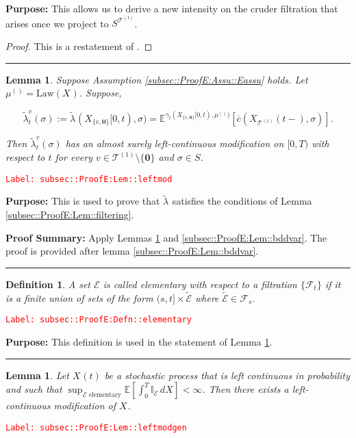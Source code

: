 \documentclass[12pt]{article}
\newcommand{\mb}{\mathbb}
\newcommand{\mc}{\mathcal}
\newcommand{\ov}{\overline}
\newcommand{\te}{\text}
\newcommand{\tr}{\textcolor{red}}
\newcommand{\labe}[1]{\tr{\texttt{Label: #1}}}
\newcommand{\purpose}{\textbf{Purpose: }}
\newcommand{\pfsum}{\textbf{Proof Summary: }}
\newcommand{\lin}{\rule{\linewidth}{0.4 pt}}
\newcommand{\ex}[1]{\mb{E}\left[#1\right]}			%
\newcommand{\exmu}[2]{\mb{E}^{#1}\left[#2\right]}	%
\renewcommand{\root}{\mathbf{0}}				%
\renewcommand{\v}{v}							%
\renewcommand{\S}{S}							%
\newcommand{\s}{\sigma}							%
\newcommand{\T}{T}								%
\renewcommand{\t}{t}							%
\renewcommand{\tt}{s}							%
\newcommand{\F}{\mc{F}}							%
\newcommand{\X}{X}								%
\newcommand{\vind}[1]{^{#1}}					%
\newcommand{\carp}[1]{^{#1}}					%
\newcommand{\vsi}[1]{^{#1}}						%
\newcommand{\cind}[1]{_{#1}}					%
\newcommand{\tp}[1]{(#1)}						%
\newcommand{\tip}[1]{#1}						%
\newcommand{\ts}[1]{_{#1}}						%
\newcommand{\IGrg}{\ov{c}}						%
\newcommand{\tree}{\mc{T}}						%
\newcommand{\sln}[1]{^{(#1)}}					%
\newcommand{\alt}[1]{\widetilde{#1}}			%
\newcommand{\m}{\mu}							%
\newcommand{\cm}{\gamma}						%
\newcommand{\law}{\te{Law}}						%
\newcommand{\evnt}{\mc{E}}						%
\newcommand{\crate}{\alt{\lambda}}				%
\newtheorem{lem}[thms]{Lemma}
\newtheorem{defn}[thms]{Definition}
\begin{document}
\purpose This allows us to derive a new intensity on the cruder filtration that arises once we project to \(\S\carp{\tree\sln{1}}\).

\begin{proof}
This is a restatement of \cite[Theorem 14.3.III]{DalVer08}.
\end{proof}

\lin

\begin{lem}
Suppose Assumption \ref{subsec::ProofE:Assu::Eassu} holds. Let \(\m\sln{}\ts{} = \law(\X\cind{}\tip{})\). Suppose,

\[\crate\vind{\v}\ts{\t}(\s) := \crate\vind{}\ts{}(\X\cind{\{\v,\root\}}\tip{[0,\t)},\s) = \exmu{\cm\ts{\t}(\X\cind{\{\v,\root\}}\tip{[0,\t)},\m\sln{}\ts{})}{\IGrg(\X\cind{\tree\sln{1}}\tp{\t-},\s)}.\]


Then \(\crate\vind{\v}\ts{\t}(\s)\) has an almost surely left-continuous modification on \([0,\T)\) with respect to \(\t\) for every \(\v \in \tree\sln{1}\setminus\{\root\}\) and \(\s \in \S\).
\label{subsec::ProofE:Lem::leftmod}
\end{lem}
\labe{subsec::ProofE:Lem::leftmod}

\purpose This is used to prove that \(\crate\vind{}\ts{}\) satisfies the conditions of Lemma \ref{subsec::ProofE:Lem::filtering}.

\pfsum Apply Lemmas \ref{subsec::ProofE:Lem::leftmodgen} and \ref{subsec::ProofE:Lem::bddvar}. The proof is provided after lemma \ref{subsec::ProofE:Lem::bddvar}.

\lin

\begin{defn}
A set \(\evnt\) is called elementary with respect to a filtration \(\{\F\vsi{}\ts{\t}\}\) if it is a finite union of sets of the form \((\tt,\t]\times \alt{\evnt}\) where \(\alt{\evnt} \in \F\vsi{}\ts{\tt}\).
\label{subsec::ProofE:Defn::elementary}
\end{defn}
\labe{subsec::ProofE:Defn::elementary}

\purpose This definition is used in the statement of Lemma \ref{subsec::ProofE:Lem::leftmodgen}.

\lin

\begin{lem}
Let \(\X\cind{}\tp{\t}\) be a stochastic process that is left continuous in probability and such that \(\sup_{\evnt\te{ elementary}}\ex{\int_0^\T \mb{I}_\evnt\,d\X\cind{}\tip{}} < \infty\). Then there exists a left-continuous modification of \(\X\cind{}\tip{}\).
\label{subsec::ProofE:Lem::leftmodgen}
\end{lem}
\labe{subsec::ProofE:Lem::leftmodgen}
\end{document}
